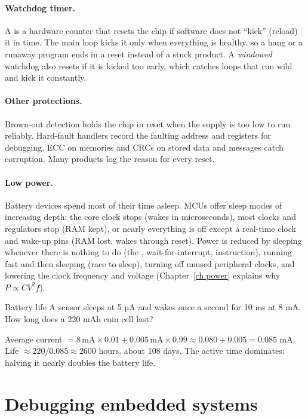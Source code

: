 \paragraph{Watchdog timer.} A  is a hardware counter that resets the chip if software does not ``kick'' (reload) it in time. The main loop kicks it only when everything is healthy, so a hang or a runaway program ends in a reset instead of a stuck product. A \emph{windowed} watchdog also resets if it is kicked too early, which catches loops that run wild and kick it constantly.

\paragraph{Other protections.} Brown-out detection holds the chip in reset when the supply is too low to run reliably. Hard-fault handlers record the faulting address and registers for debugging. ECC on memories and CRCs on stored data and messages catch corruption. Many products log the reason for every reset.

\paragraph{Low power.} Battery devices spend most of their time asleep. MCUs offer sleep modes of increasing depth: the core clock stops (wakes in microseconds), most clocks and regulators stop (RAM kept), or nearly everything is off except a real-time clock and wake-up pins (RAM lost, wakes through reset). Power is reduced by sleeping whenever there is nothing to do (the , wait-for-interrupt, instruction), running fast and then sleeping (race to sleep), turning off unused peripheral clocks, and lowering the clock frequency and voltage (Chapter~\ref{ch:power} explains why $P \propto CV^2f$).

\begin{worked}{Battery life}
A sensor sleeps at 5 µA and wakes once a second for 10 ms at 8 mA. How long does a 220 mAh coin cell last?

Average current $= 8\,\text{mA} \times 0.01 + 0.005\,\text{mA} \times 0.99 \approx 0.080 + 0.005 = 0.085$ mA. Life $\approx 220 / 0.085 \approx 2600$ hours, about 108 days. The active time dominates: halving it nearly doubles the battery life.
\end{worked}

\section{Debugging embedded systems}

